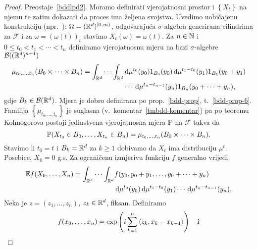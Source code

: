 \documentclass[main.tex]{subfiles}
\begin{document}
\begin{proof}
	Preostaje~\ref{bddlpd2}. Moramo definirati vjerojatnosni prostor i \( \left\{ X_t \right\} \) na njemu te zatim dokazati da proces ima željena svojstva.
	Uvedimo uobičajenu konstrukciju (npr.~\cite[str.~4]{sato}): \( \Omega = (\R^d)^{\left[0, \infty \right\rangle} \), odgovarajuća \( \sigma \)-algebra
	generirana cilindrima za \( \mathcal F \) i za \( \omega=(\omega(t))_t \) stavimo \( X_t(\omega)=\omega(t) \). Za
	\( n \in \N \) i \( 0 \le t_0 < t_1 < \cdots < t_n \) definiramo vjerojatnosnu mjeru na bazi \( \sigma \)-algebre \(\mathcal B((\R^d)^{n+1})  \)
	\begin{equation} \label{tmbdd-mjera}
		\begin{aligned}
			\mu_{t_0, \ldots, t_n}(B_0 \times \cdots \times B_n) =
			\int_{\R^d} \cdots \int_{\R^d} & \D \mu^{t_0}(y_0) 1_{B_0}(y_0)
			\D \mu^{t_1-t_0}(y_1)1_{B_1}(y_0+y_1)                           \\ &\cdots
			\D \mu^{t_n-t_{n-1}}(y_n)1_{B_n}(y_0+\cdots+y_n),
		\end{aligned}
	\end{equation}
	gdje \( B_k \in \mathcal B(\R^d) \). Mjera je dobro definirana po prop.~\ref{bdd-prop}, t.~\ref{bdd-prop-6}. Familija \( \left\{ \mu_{t_0,\ldots,t_n} \right\} \)
	je suglasna (v.\ komentar~\ref{tmbdd-komentar}) pa po teoremu Kolmogorova postoji jedinstvena vjerojatnosna mjera \( \P \) na \( \mathcal F \) takva da
	\begin{equation}
		\P(X_{t_0} \in B_0, \ldots , X_{t_n} \in B_n) = \mu_{t_0, \ldots, t_n}(B_0 \times \cdots \times B_n).
	\end{equation}
	Stavimo li \( t_0 = t \) i \( B_k = \R^d \) za \( k \ge 1 \) dobivamo da \( X_t \) ima distribuciju \( \mu^t \). Posebice, \( X_0 = 0 \) g.s. Za ograničenu izmjerivu funkciju \( f \) generalno vrijedi
	\begin{equation} \label{eq:tmbddef}
		\begin{aligned}
			\E f(X_0, \ldots, X_n) = \int_{\R^d} \cdots \int_{\R^d} & f(y_0, y_0+y_1, \ldots, y_0+\cdots+y_n)
			\\ & \D \mu^{t_0}(y_0) \D \mu^{t_1-t_0}(y_1) \cdots \D \mu^{t_n-t_{n-1}}(y_n).
		\end{aligned}
	\end{equation}
	Neka je \( z = (z_1, \ldots, z_n) \), \( z_k \in \R^d \), fiksan. Definiramo
	\begin{equation}
		\begin{aligned}
			 & f(x_0, \ldots, x_n) = \exp\left( i \sum_{k=1}^n \skp{z_k}{x_k-x_{k-1}}  \right)
			\quad \mathrm{i}                                                                              \\

\end{aligned}
\end{equation}
\end{proof}
\end{document}
